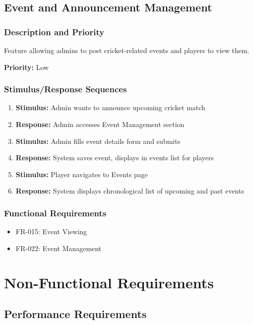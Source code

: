 \documentclass[12pt,a4paper]{article}
\begin{document}
\begin{enumerate}
\subsection{Event and Announcement Management}

\subsubsection{Description and Priority}
Feature allowing admins to post cricket-related events and players to view them.

\textbf{Priority:} Low

\subsubsection{Stimulus/Response Sequences}
\begin{enumerate}
    \item \textbf{Stimulus:} Admin wants to announce upcoming cricket match
    \item \textbf{Response:} Admin accesses Event Management section
    \item \textbf{Stimulus:} Admin fills event details form and submits
    \item \textbf{Response:} System saves event, displays in events list for players
    \item \textbf{Stimulus:} Player navigates to Events page
    \item \textbf{Response:} System displays chronological list of upcoming and past events
\end{enumerate}

\subsubsection{Functional Requirements}
\begin{itemize}
    \item FR-015: Event Viewing
    \item FR-022: Event Management
\end{itemize}

\newpage

\section{Non-Functional Requirements}

\subsection{Performance Requirements}


\end{enumerate}
\end{document}
